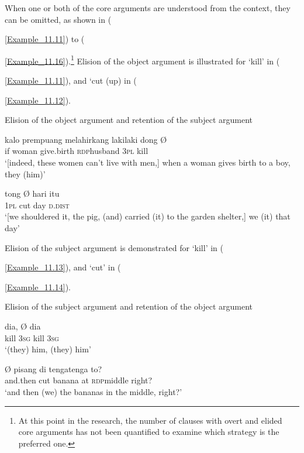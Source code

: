 {{{{{{{{{{{{{When one or both of the core arguments are understood from the context, they can be omitted, as shown in ({\ref{Example_11.11}) to ({\ref{Example_11.16}).\footnote{
At this point in the research, the number of clauses with overt and elided core arguments has not been quantified to examine which strategy is the preferred one.} Elision of the object argument is illustrated for  ‘kill’ in ({\ref{Example_11.11}), and  ‘cut (up) in ({\ref{Example_11.12}).


\begin{styleExampleTitle}
Elision of the object argument and retention of the subject argument
\end{styleExampleTitle}

\ea
\label{Example_11.11}
\gll {\ldots} {kalo} {prempuang} {melahirkang} {laki{\Tilde}laki} {dong} {} {Ø}\\ %
 {}   if  woman  give.birth  \textsc{rdp}{\Tilde}husband  \textsc{3pl}  kill  \\
\glt 
‘[indeed, these women can’t live with men,] when a woman gives birth to a boy, they  (him)’ \textstyleExampleSource{[081006-023-CvEx.0058]}
\z

\ea
\label{Example_11.12}
\gll {\ldots} {tong} {} {Ø} {hari} {itu}\\ %
 {}  \textsc{1pl}  cut  {}  day  \textsc{d.dist}\\
\glt 
‘[we shouldered it, the pig, (and) carried (it) to the garden shelter,] we  (it)  that day’ \textstyleExampleSource{[080919-003-NP.0013-0014]}
\z


Elision of the subject argument is demonstrated for  ‘kill’ in ({\ref{Example_11.13}), and  ‘cut’ in ({\ref{Example_11.14}).


\begin{styleExampleTitle}
Elision of the subject argument and retention of the object argument
\end{styleExampleTitle}

\ea
\label{Example_11.13}
 {} {dia,} {Ø} {} {dia}\\ %
 {}  kill  \textsc{3sg} {}   kill  \textsc{3sg}\\
\glt 
‘(they)  him, (they)  him’ \textstyleExampleSource{[081006-022-CvEx.0088]}
\z

\ea
\label{Example_11.14}
 {Ø} {} {pisang} {di} {tenga{\Tilde}tenga} {to?}\\ %
 and.then {}  cut  banana  at  \textsc{rdp}{\Tilde}middle  right?\\
\glt 
‘and then (we)  the bananas in the middle, right?’ \textstyleExampleSource{[080922-009-CvNP.0041]}
\z


}}}}}}}}}}}}}}}}}}}
